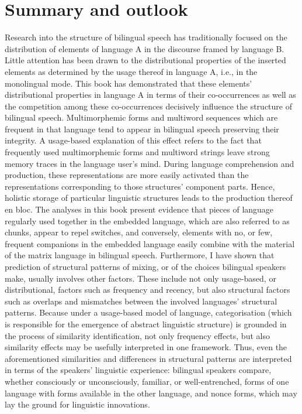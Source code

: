 \chapter*{Summary and outlook} %
Research into the structure of bilingual speech has traditionally focused on the distribution of elements of language A in the discourse framed by language B. Little attention has been drawn to the distributional properties of the inserted elements as determined by the usage thereof in language A, i.e., in the monolingual mode. This book has demonstrated that these elements’ distributional properties in language A in terms of their co-occurrences as well as the competition among these co-occurrences decisively influence the structure of bilingual speech. Multimorphemic forms and multiword sequences which are frequent in that language tend to appear in bilingual speech preserving their integrity. A usage-based explanation of this effect refers to the fact that frequently used multimorphemic forms and multiword strings leave strong memory traces in the language user's mind. During language comprehension and production, these representations are more easily activated than the representations corresponding to those structures’ component parts. Hence, holistic storage of particular linguistic structures leads to the production thereof en bloc. The analyses in this book present evidence that pieces of language regularly used together in the  embedded language, which are also referred to as chunks, appear to repel switches, and conversely, elements with no, or few, frequent companions in the embedded language easily combine with the material of the matrix language in bilingual speech. Furthermore, I have  shown that prediction of structural patterns of mixing, or of the choices bilingual speakers make, usually involves other factors. These include not only usage-based, or distributional, factors such as frequency and recency, but also structural factors such as overlaps and mismatches between the involved languages’ structural patterns. Because under a usage-based model of language, categorisation (which is responsible for the emergence of abstract linguistic structure) is grounded in the process of similarity identification, not only frequency effects, but also similarity effects may be usefully interpreted in one framework. Thus, even the aforementioned similarities and differences in structural patterns are interpreted in terms of the speakers’ linguistic experience: bilingual speakers compare, whether consciously or unconsciously, familiar, or well-entrenched, forms of one language with forms available in the other language, and nonce forms, which may lay the ground for linguistic innovations. %

